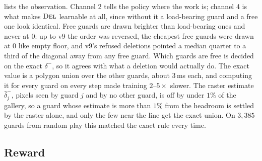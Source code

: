 \documentclass[11pt,a4paper]{article}
\begin{document}
 lists the observation. Channel 2 tells the policy where the work is; channel 4
is what makes $\textsc{Del}$ learnable at all, since without it a load-bearing guard and a free one
look identical. Free guards are drawn brighter than load-bearing ones and never at $0$: up to
v9 the order was reversed, the cheapest free guards were drawn at $0$ like empty floor, and
v9's refused deletions pointed a median quarter to a third of the diagonal away from any free
guard. Which guards are free is decided on the exact $\delta^-$, so it agrees with
what a deletion would actually do. The exact value is a polygon union over the other guards,
about $3$\,ms each, and computing it for every guard on every step made training $2$--$5\times$
slower. The raster estimate $\hat\delta^-_j$, pixels seen by guard $j$ and by no other guard, is
off by under $1\%$ of the gallery, so a guard whose estimate is more than $1\%$ from the
headroom is settled by the raster alone, and only the few near the line get the exact union.
On $3{,}385$ guards from random play this matched the exact rule every time.

\subsection{Reward}\label{sec:reward}
\end{document}
